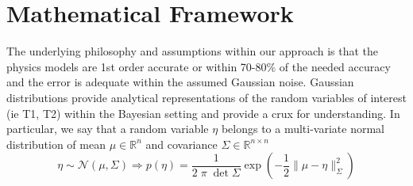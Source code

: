 \documentclass{article}         %
\theoremstyle{definition}
\theoremstyle{remark}
\begin{document}
\section{Mathematical Framework}\label{GeneralMathFramework}

The underlying philosophy and assumptions within our approach is that the physics 
models are 1st order accurate or within 70-80\% of the needed accuracy and the error is
adequate within the assumed Gaussian noise.
Gaussian distributions provide analytical representations of the random
variables of interest (ie T1, T2) within the Bayesian setting and 
provide a crux for understanding. In particular, we say that a random
variable $\eta$ belongs to a multi-variate normal distribution 
of mean $\mu \in \mathbb{R}^n $ and covariance $\Sigma \in \mathbb{R}^{n \times n}$
\[
     \eta \sim \mathcal{N}(\mu,\Sigma)  
    \Rightarrow
      p(\eta)  = \frac{1}{2 \; \pi \; \det{\Sigma}} \exp\left( - \frac{1}{2} \| \mu - \eta\|^2_{\Sigma}\right)
\]
\end{document}
